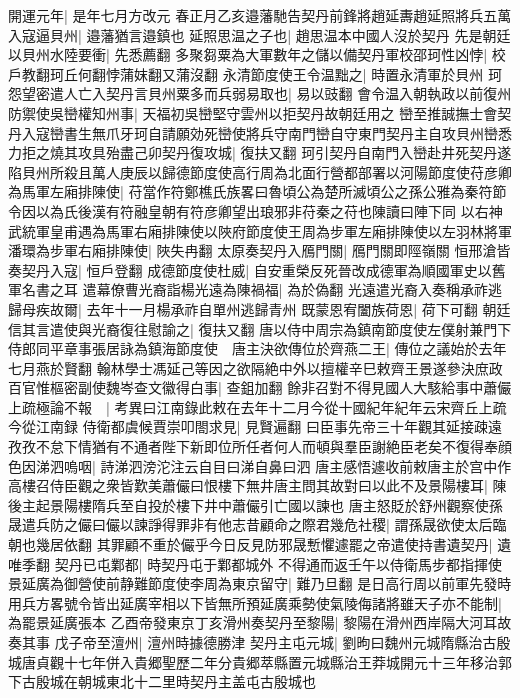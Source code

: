開運元年|{
	是年七月方改元}
春正月乙亥邉藩馳告契丹前鋒將趙延夀趙延照將兵五萬入寇逼貝州|{
	邉藩猶言邉鎮也}
延照思温之子也|{
	趙思温本中國人沒於契丹}
先是朝廷以貝州水陸要衝|{
	先悉薦翻}
多聚芻粟為大軍數年之儲以備契丹軍校邵珂性凶悖|{
	校戶教翻珂丘何翻悖蒲妺翻又蒲沒翻}
永清節度使王令温黜之|{
	時置永清軍於貝州}
珂怨望密遣人亡入契丹言貝州粟多而兵弱易取也|{
	易以豉翻}
會令温入朝執政以前復州防禦使吳巒權知州事|{
	天福初吳巒堅守雲州以拒契丹故朝廷用之}
巒至推誠撫士會契丹入寇巒書生無爪牙珂自請願効死巒使將兵守南門巒自守東門契丹主自攻貝州巒悉力拒之燒其攻具殆盡己卯契丹復攻城|{
	復扶又翻}
珂引契丹自南門入巒赴井死契丹遂陷貝州所殺且萬人庚辰以歸德節度使高行周為北面行營都部署以河陽節度使苻彦卿為馬軍左廂排陳使|{
	苻當作符鄭樵氏族畧曰魯頃公為楚所滅頃公之孫公雅為秦符節令因以為氏後漢有符融皇朝有符彦卿望出琅邪非苻秦之苻也陳讀曰陣下同}
以右神武統軍皇甫遇為馬軍右廂排陳使以陜府節度使王周為步軍左廂排陳使以左羽林將軍潘環為步軍右廂排陳使|{
	陜失冉翻}
太原奏契丹入鴈門關|{
	鴈門關即陘嶺關}
恒邢滄皆奏契丹入寇|{
	恒戶登翻}
成德節度使杜威|{
	自安重榮反死晉改成德軍為順國軍史以舊軍名書之耳}
遣幕僚曹光裔詣楊光遠為陳禍福|{
	為於偽翻}
光遠遣光裔入奏稱承祚逃歸母疾故爾|{
	去年十一月楊承祚自單州逃歸青州}
既蒙恩宥闔族荷恩|{
	荷下可翻}
朝廷信其言遣使與光裔復往慰諭之|{
	復扶又翻}
唐以侍中周宗為鎮南節度使左僕射兼門下侍郎同平章事張居詠為鎮海節度使　唐主決欲傳位於齊燕二王|{
	傳位之議始於去年七月燕於賢翻}
翰林學士馮延己等因之欲隔絶中外以擅權辛巳敕齊王景遂參決庶政百官惟樞密副使魏岑查文徽得白事|{
	查鉏加翻}
餘非召對不得見國人大駭給事中蕭儼上疏極論不報　|{
	考異曰江南錄此敕在去年十二月今從十國紀年紀年云宋齊丘上疏今從江南録}
侍衛都虞候賈崇叩閤求見|{
	見賢遍翻}
曰臣事先帝三十年觀其延接疎遠孜孜不怠下情猶有不通者陛下新即位所任者何人而頓與羣臣謝絶臣老矣不復得奉顔色因涕泗嗚咽|{
	詩涕泗滂沱注云自目曰涕自鼻曰泗}
唐主感悟遽收前敕唐主於宫中作高樓召侍臣觀之衆皆歎美蕭儼曰恨樓下無井唐主問其故對曰以此不及景陽樓耳|{
	陳後主起景陽樓隋兵至自投於樓下井中蕭儼引亡國以諫也}
唐主怒貶於舒州觀察使孫晟遣兵防之儼曰儼以諫諍得罪非有他志昔顧命之際君幾危社稷|{
	謂孫晟欲使太后臨朝也幾居依翻}
其罪顧不重於儼乎今日反見防邪晟慙懼遽罷之帝遣使持書遺契丹|{
	遺唯季翻}
契丹已屯鄴都|{
	時契丹屯于鄴都城外}
不得通而返壬午以侍衛馬步都指揮使景延廣為御營使前静難節度使李周為東京留守|{
	難乃旦翻}
是日高行周以前軍先發時用兵方畧號令皆出延廣宰相以下皆無所預延廣乘勢使氣陵侮諸將雖天子亦不能制|{
	為罷景延廣張本}
乙酉帝發東京丁亥滑州奏契丹至黎陽|{
	黎陽在滑州西岸隔大河耳故奏其事}
戊子帝至澶州|{
	澶州時據德勝津}
契丹主屯元城|{
	劉昫曰魏州元城隋縣治古殷城唐貞觀十七年併入貴郷聖歷二年分貴郷萃縣置元城縣治王莽城開元十三年移治郭下古殷城在朝城東北十二里時契丹主盖屯古殷城也}
